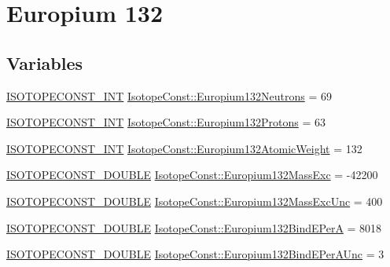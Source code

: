 \hypertarget{group___isotope_const-_europium-_eu132}{}\section{Europium 132}
\label{group___isotope_const-_europium-_eu132}
\subsection*{Variables}
\begin{DoxyCompactItemize}
\item 
\mbox{\hyperlink{group___isotope_const-_macros_ga5f18360b3e99483a35c32d789e62621c}{I\+S\+O\+T\+O\+P\+E\+C\+O\+N\+S\+T\+\_\+\+I\+NT}} \mbox{\hyperlink{group___isotope_const-_europium-_eu132_ga6179a5b6e7acc6e53e65d77ae025f27c}{Isotope\+Const\+::\+Europium132\+Neutrons}} = 69
\item 
\mbox{\hyperlink{group___isotope_const-_macros_ga5f18360b3e99483a35c32d789e62621c}{I\+S\+O\+T\+O\+P\+E\+C\+O\+N\+S\+T\+\_\+\+I\+NT}} \mbox{\hyperlink{group___isotope_const-_europium-_eu132_ga1b7dcce6c2e5f40c8bdf85cacd0c6042}{Isotope\+Const\+::\+Europium132\+Protons}} = 63
\item 
\mbox{\hyperlink{group___isotope_const-_macros_ga5f18360b3e99483a35c32d789e62621c}{I\+S\+O\+T\+O\+P\+E\+C\+O\+N\+S\+T\+\_\+\+I\+NT}} \mbox{\hyperlink{group___isotope_const-_europium-_eu132_gad2a5e4ca46b82830f763330095226487}{Isotope\+Const\+::\+Europium132\+Atomic\+Weight}} = 132
\item 
\mbox{\hyperlink{group___isotope_const-_macros_ga8f45a7272ce02c0b4c65c44636ed719a}{I\+S\+O\+T\+O\+P\+E\+C\+O\+N\+S\+T\+\_\+\+D\+O\+U\+B\+LE}} \mbox{\hyperlink{group___isotope_const-_europium-_eu132_ga1b6b267d8acb07f59350214c3bfe9e0d}{Isotope\+Const\+::\+Europium132\+Mass\+Exc}} = -\/42200
\item 
\mbox{\hyperlink{group___isotope_const-_macros_ga8f45a7272ce02c0b4c65c44636ed719a}{I\+S\+O\+T\+O\+P\+E\+C\+O\+N\+S\+T\+\_\+\+D\+O\+U\+B\+LE}} \mbox{\hyperlink{group___isotope_const-_europium-_eu132_ga1cb0501d97e0b83ffa04f7bf4c60bbe0}{Isotope\+Const\+::\+Europium132\+Mass\+Exc\+Unc}} = 400
\item 
\mbox{\hyperlink{group___isotope_const-_macros_ga8f45a7272ce02c0b4c65c44636ed719a}{I\+S\+O\+T\+O\+P\+E\+C\+O\+N\+S\+T\+\_\+\+D\+O\+U\+B\+LE}} \mbox{\hyperlink{group___isotope_const-_europium-_eu132_gacab533586b8af0be72956f4742488ef9}{Isotope\+Const\+::\+Europium132\+Bind\+E\+PerA}} = 8018
\item 
\mbox{\hyperlink{group___isotope_const-_macros_ga8f45a7272ce02c0b4c65c44636ed719a}{I\+S\+O\+T\+O\+P\+E\+C\+O\+N\+S\+T\+\_\+\+D\+O\+U\+B\+LE}} \mbox{\hyperlink{group___isotope_const-_europium-_eu132_gaa7402b56ca6d2c9ca95ce45224bc5833}{Isotope\+Const\+::\+Europium132\+Bind\+E\+Per\+A\+Unc}} = 3

\end{DoxyCompactItemize}
